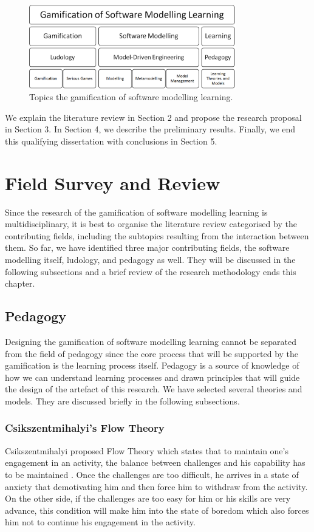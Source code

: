 \documentclass[12pt, a4paper]{report}
\begin{document}
\begin{figure}[ht]
\centering
\includegraphics[width=9cm]{smlg2}
\caption{Topics the gamification of software modelling learning.}
\label{fig:smlg2}
\end{figure}

We explain the literature review in Section 2 and propose the research proposal in Section 3. In Section 4, we describe the preliminary results. Finally, we end this qualifying dissertation with conclusions in Section 5.


\chapter{Field Survey and Review}

Since the research of the gamification of software modelling learning is multidisciplinary, it is best to organise the literature review categorised by the contributing fields, including the subtopics resulting from the interaction between them. So far, we have identified three major contributing fields, the software modelling itself, ludology, and pedagogy as well. They will be discussed in the following subsections and a brief review of the research methodology ends this chapter.

\section{Pedagogy}
\label{Pedagogy}
Designing the gamification of software modelling learning cannot be separated from the field of pedagogy since the core process that will be supported by the gamification is the learning process itself. Pedagogy is a source of knowledge of how we can understand learning processes and drawn principles that will guide the design of the artefact of this research. We have selected several theories and models. They are discussed briefly in the following subsections.

\subsection{Csikszentmihalyi's Flow Theory}
Csikszentmihalyi proposed Flow Theory which states that to maintain one's engagement in an activity, the balance between challenges and his capability has to be maintained \cite{csikszentmihalyi2014toward}. Once the challenges are too difficult, he arrives in a state of anxiety that demotivating him and then force him to withdraw from the activity. On the other side, if the challenges are too easy for him or his skills are very advance, this condition will make him into the state of boredom which also forces him not to continue his engagement in the activity.
\end{document}
